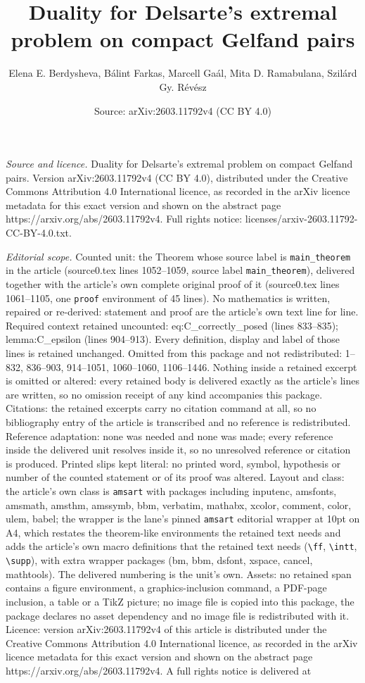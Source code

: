 \documentclass[10pt,a4paper]{amsart}
\title[Duality for Delsarte's extremal problem on compact Gelfand p]{Duality for Delsarte's extremal problem on compact Gelfand pairs}
\author{Elena E. Berdysheva, B\'alint Farkas, Marcell Ga\'al, Mita D. Ramabulana, Szil\'ard Gy. R\'ev\'esz}
\date{Source: arXiv:2603.11792v4 (CC BY 4.0)}
\begin{document}
\maketitle

\noindent\emph{Source and licence.} Duality for Delsarte's extremal problem on compact Gelfand pairs. Version arXiv:2603.11792v4 (CC BY 4.0), distributed under the Creative Commons Attribution 4.0 International licence, as recorded in the arXiv licence metadata for this exact version and shown on the abstract page https://arxiv.org/abs/2603.11792v4. Full rights notice: licenses/arxiv-2603.11792-CC-BY-4.0.txt.\par\smallskip

\noindent\textit{Editorial scope.} Counted unit: the Theorem whose source label is \texttt{main\_theorem} in the article (source0.tex lines 1052--1059, source label \texttt{main\_theorem}), delivered together with the article's own complete original proof of it (source0.tex lines 1061--1105, one \texttt{proof} environment of 45 lines). No mathematics is written, repaired or re-derived: statement and proof are the article's own text line for line. Required context retained uncounted: eq:C\_correctly\_posed (lines 833--835); lemma:C\_epsilon (lines 904--913). Every definition, display and label of those lines is retained unchanged. Omitted from this package and not redistributed: 1--832, 836--903, 914--1051, 1060--1060, 1106--1446. Nothing inside a retained excerpt is omitted or altered: every retained body is delivered exactly as the article's lines are written, so no omission receipt of any kind accompanies this package. Citations: the retained excerpts carry no citation command at all, so no bibliography entry of the article is transcribed and no reference is redistributed. Reference adaptation: none was needed and none was made; every reference inside the delivered unit resolves inside it, so no unresolved reference or citation is produced. Printed slips kept literal: no printed word, symbol, hypothesis or number of the counted statement or of its proof was altered. Layout and class: the article's own class is \texttt{amsart} with packages including inputenc, amsfonts, amsmath, amsthm, amssymb, bbm, verbatim, mathabx, xcolor, comment, color, ulem, babel; the wrapper is the lane's pinned \texttt{amsart} editorial wrapper at 10pt on A4, which restates the theorem-like environments the retained text needs and adds the article's own macro definitions that the retained text needs (\texttt{\textbackslash ff}, \texttt{\textbackslash intt}, \texttt{\textbackslash supp}), with extra wrapper packages (bm, bbm, dsfont, xspace, cancel, mathtools). The delivered numbering is the unit's own. Assets: no retained span contains a figure environment, a graphics-inclusion command, a PDF-page inclusion, a table or a TikZ picture; no image file is copied into this package, the package declares no asset dependency and no image file is redistributed with it. Licence: version arXiv:2603.11792v4 of this article is distributed under the Creative Commons Attribution 4.0 International licence, as recorded in the arXiv licence metadata for this exact version and shown on the abstract page https://arxiv.org/abs/2603.11792v4. A full rights notice is delivered at 
\end{document}
